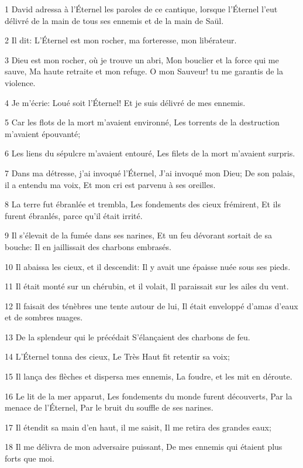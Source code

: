 \par 1 David adressa à l'Éternel les paroles de ce cantique, lorsque l'Éternel l'eut délivré de la main de tous ses ennemis et de la main de Saül.
\par 2 Il dit: L'Éternel est mon rocher, ma forteresse, mon libérateur.
\par 3 Dieu est mon rocher, où je trouve un abri, Mon bouclier et la force qui me sauve, Ma haute retraite et mon refuge. O mon Sauveur! tu me garantis de la violence.
\par 4 Je m'écrie: Loué soit l'Éternel! Et je suis délivré de mes ennemis.
\par 5 Car les flots de la mort m'avaient environné, Les torrents de la destruction m'avaient épouvanté;
\par 6 Les liens du sépulcre m'avaient entouré, Les filets de la mort m'avaient surpris.
\par 7 Dans ma détresse, j'ai invoqué l'Éternel, J'ai invoqué mon Dieu; De son palais, il a entendu ma voix, Et mon cri est parvenu à ses oreilles.
\par 8 La terre fut ébranlée et trembla, Les fondements des cieux frémirent, Et ils furent ébranlés, parce qu'il était irrité.
\par 9 Il s'élevait de la fumée dans ses narines, Et un feu dévorant sortait de sa bouche: Il en jaillissait des charbons embrasés.
\par 10 Il abaissa les cieux, et il descendit: Il y avait une épaisse nuée sous ses pieds.
\par 11 Il était monté sur un chérubin, et il volait, Il paraissait sur les ailes du vent.
\par 12 Il faisait des ténèbres une tente autour de lui, Il était enveloppé d'amas d'eaux et de sombres nuages.
\par 13 De la splendeur qui le précédait S'élançaient des charbons de feu.
\par 14 L'Éternel tonna des cieux, Le Très Haut fit retentir sa voix;
\par 15 Il lança des flèches et dispersa mes ennemis, La foudre, et les mit en déroute.
\par 16 Le lit de la mer apparut, Les fondements du monde furent découverts, Par la menace de l'Éternel, Par le bruit du souffle de ses narines.
\par 17 Il étendit sa main d'en haut, il me saisit, Il me retira des grandes eaux;
\par 18 Il me délivra de mon adversaire puissant, De mes ennemis qui étaient plus forts que moi.
